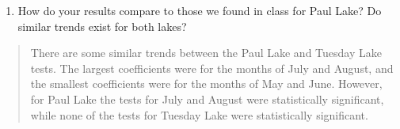 \documentclass[]{article}
\providecommand{\tightlist}{%
  \setlength{\itemsep}{0pt}\setlength{\parskip}{0pt}}
\begin{document}
\begin{enumerate}
\def\labelenumi{\arabic{enumi}.}
\setcounter{enumi}{11}
\tightlist
\item
  How do your results compare to those we found in class for Paul Lake?
  Do similar trends exist for both lakes?
\end{enumerate}

\begin{quote}
There are some similar trends between the Paul Lake and Tuesday Lake
tests. The largest coefficients were for the months of July and August,
and the smallest coefficients were for the months of May and June.
However, for Paul Lake the tests for July and August were statistically
significant, while none of the tests for Tuesday Lake were statistically
significant.
\end{quote}
\end{document}
